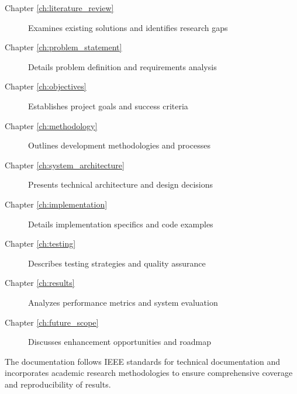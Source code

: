 \begin{description}
    \item[Chapter \ref{ch:literature_review}] Examines existing solutions and identifies research gaps
    \item[Chapter \ref{ch:problem_statement}] Details problem definition and requirements analysis
    \item[Chapter \ref{ch:objectives}] Establishes project goals and success criteria
    \item[Chapter \ref{ch:methodology}] Outlines development methodologies and processes
    \item[Chapter \ref{ch:system_architecture}] Presents technical architecture and design decisions
    \item[Chapter \ref{ch:implementation}] Details implementation specifics and code examples
    \item[Chapter \ref{ch:testing}] Describes testing strategies and quality assurance
    \item[Chapter \ref{ch:results}] Analyzes performance metrics and system evaluation
    \item[Chapter \ref{ch:future_scope}] Discusses enhancement opportunities and roadmap
\end{description}

The documentation follows IEEE standards for technical documentation and incorporates academic research methodologies to ensure comprehensive coverage and reproducibility of results.

